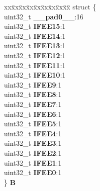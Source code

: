 \begin{DoxyCompactItemize}
\begin{tabbing}
\end{tabbing}\item 
\mbox{\label{unionSIU__tag_1_1SIU__IFEER__tag_abdd1d5e560cc77e306b34f4aac14c29c}} 
\begin{tabbing}
xx\=xx\=xx\=xx\=xx\=xx\=xx\=xx\=xx\=\kill
struct \{\\
\>uint32\_t {\bfseries \_\_pad0\_\_}:16\\
\>uint32\_t {\bfseries IFEE15}:1\\
\>uint32\_t {\bfseries IFEE14}:1\\
\>uint32\_t {\bfseries IFEE13}:1\\
\>uint32\_t {\bfseries IFEE12}:1\\
\>uint32\_t {\bfseries IFEE11}:1\\
\>uint32\_t {\bfseries IFEE10}:1\\
\>uint32\_t {\bfseries IFEE9}:1\\
\>uint32\_t {\bfseries IFEE8}:1\\
\>uint32\_t {\bfseries IFEE7}:1\\
\>uint32\_t {\bfseries IFEE6}:1\\
\>uint32\_t {\bfseries IFEE5}:1\\
\>uint32\_t {\bfseries IFEE4}:1\\
\>uint32\_t {\bfseries IFEE3}:1\\
\>uint32\_t {\bfseries IFEE2}:1\\
\>uint32\_t {\bfseries IFEE1}:1\\
\>uint32\_t {\bfseries IFEE0}:1\\
\} {\bfseries B}\\


\end{tabbing}
\end{DoxyCompactItemize}
